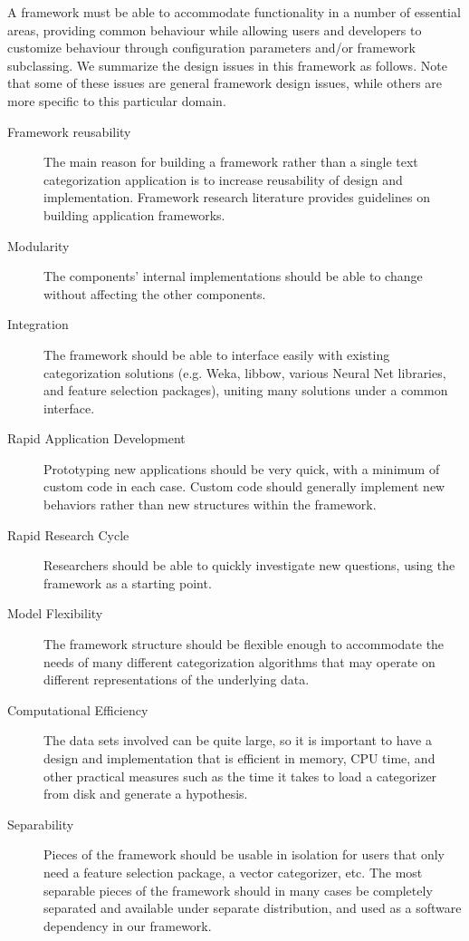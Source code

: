 \begin{singlespace}
A framework must be able to accommodate functionality in a number of
essential areas, providing common behaviour while allowing users and
developers to customize behaviour through configuration parameters
and/or framework subclassing.  We summarize the design issues in this
framework as follows.  Note that some of these issues are general
framework design issues, while others are more specific to this
particular domain.

\begin{description}
\item[Framework reusability] The main reason for building a framework
rather than a single text categorization application is to increase
reusability of design and implementation.  Framework research
literature provides guidelines on building application
frameworks.\cite{fayad:99}
\item[Modularity] The components' internal implementations should be
able to change without affecting the other components.
\item[Integration] The framework should be able to interface easily
with existing categorization solutions (e.g. Weka, libbow, various
Neural Net libraries, and feature selection packages), uniting many
solutions under a common interface.
\item[Rapid Application Development] Prototyping new applications
should be very quick, with a minimum of custom code in each case.
Custom code should generally implement new behaviors rather than new
structures within the framework.
\item[Rapid Research Cycle] Researchers should be able to quickly
investigate new questions, using the framework as a starting point.
\item[Model Flexibility] The framework structure should be flexible
enough to accommodate the needs of many different categorization
algorithms that may operate on different representations of the
underlying data.
\item[Computational Efficiency] The data sets involved can be quite
large, so it is important to have a design and implementation that is
efficient in memory, CPU time, and other practical measures such as
the time it takes to load a categorizer from disk and generate a
hypothesis.
\item[Separability] Pieces of the framework should be usable in
isolation for users that only need a feature selection package, a
vector categorizer, etc.  The most separable pieces of the framework
should in many cases be completely separated and available under
separate distribution, and used as a software dependency in our
framework.
\end{description}


\end{singlespace}
